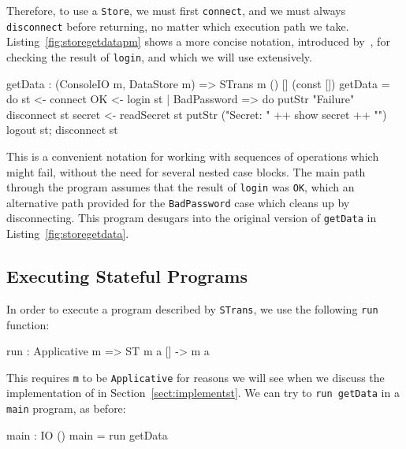 Therefore, to use a \texttt{Store}, we must first \texttt{connect}, and
we must always \texttt{disconnect} before returning, no matter which
execution path we take.
%
Listing~\ref{fig:storegetdatapm} shows a more concise notation,
introduced by~\citet{brady-tfp14}, for
checking the result of \texttt{login}, and which we will use extensively.

\small
\begin{code}[float=h, frame=single,caption={Implementing \texttt{getData}
using the \texttt{DataStore} interface, with a pattern matching bind
alternative},label=fig:storegetdatapm]
getData : (ConsoleIO m, DataStore m) => STrans m () [] (const [])
getData = do st <- connect
             OK <- login st | BadPassword => do putStr "Failure\n"
                                                disconnect st
             secret <- readSecret st
             putStr ("Secret: " ++ show secret ++ "\n")
             logout st; disconnect st
\end{code}
\normalsize

This is a convenient notation for working with sequences of operations which
might fail, without the need for several nested case blocks. The main
path through the program assumes that the result of \texttt{login} was
\texttt{OK}, which an alternative path provided for the \texttt{BadPassword}
case which cleans up by disconnecting. This program desugars into the
original version of \texttt{getData} in Listing~\ref{fig:storegetdata}.

\subsection{Executing Stateful Programs}

\label{sect:implstore}

In order to execute a program described by \texttt{STrans}, we use the
following \texttt{run} function:

\small
\begin{code}
run : Applicative m => ST m a [] -> m a
\end{code}
\normalsize

This requires \texttt{m} to be \texttt{Applicative} for reasons we will see
when we discuss the implementation of \states{} in
Section~\ref{sect:implementst}.  We can try to \texttt{run getData}
in a \texttt{main} program, as before:

\small
\begin{code}
main : IO ()
main = run getData
\end{code}
\normalsize

